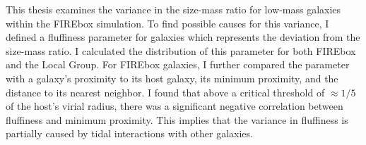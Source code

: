 


This thesis examines the variance in the size-mass ratio for low-mass galaxies within the FIREbox simulation. To find possible causes for this variance, I defined a fluffiness parameter for galaxies which represents the deviation from the size-mass ratio. I calculated the distribution of this parameter for both FIREbox and the Local Group. For FIREbox galaxies, I further compared the parameter with a galaxy's proximity to its host galaxy, its minimum proximity, and the distance to its nearest neighbor. I found that above a critical threshold of $\approx 1/5$ of the host's virial radius, there was a significant negative correlation between fluffiness and minimum proximity. This implies that the variance in fluffiness is partially caused by tidal interactions with other galaxies.